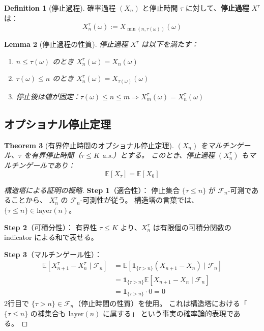 \documentclass[11pt,a4paper]{article}
\theoremstyle{plain}
\newtheorem{theorem}{Theorem}[section]
\newtheorem{lemma}[theorem]{Lemma}
\theoremstyle{definition}
\newtheorem{definition}[theorem]{Definition}
\newcommand{\FF}{\mathcal{F}}
\newcommand{\EE}{\mathbb{E}}
\newcommand{\layer}{\mathrm{layer}}
\begin{document}
\begin{definition}[停止過程]
\label{def:stopped-process}
確率過程 $(X_n)$ と停止時間 $\tau$ に対して、\textbf{停止過程} $X^\tau$ は：
\[
  X^\tau_n(\omega) := X_{\min(n, \tau(\omega))}(\omega)
\]
\end{definition}

\begin{lemma}[停止過程の性質]
\label{lem:stopped-process-properties}
停止過程 $X^\tau$ は以下を満たす：
\begin{enumerate}[label=(\roman*)]
  \item $n \leq \tau(\omega)$ のとき $X^\tau_n(\omega) = X_n(\omega)$
  \item $\tau(\omega) \leq n$ のとき $X^\tau_n(\omega) = X_{\tau(\omega)}(\omega)$
  \item 停止後は値が固定：$\tau(\omega) \leq n \leq m \Rightarrow X^\tau_m(\omega) = X^\tau_n(\omega)$
\end{enumerate}
\end{lemma}

\subsection{オプショナル停止定理}

\begin{theorem}[有界停止時間のオプショナル停止定理]
\label{thm:optional-stopping}
$(X_n)$ をマルチンゲール、$\tau$ を有界停止時間（$\tau \leq K$ a.s.）とする。
このとき、停止過程 $(X^\tau_n)$ もマルチンゲールであり：
\[
  \EE[X_\tau] = \EE[X_0]
\]
\end{theorem}

\begin{proof}[構造塔による証明の概略]
\textbf{Step 1}（適合性）：
停止集合 $\{\tau \leq n\}$ が $\FF_n$-可測であることから、
$X^\tau_n$ の $\FF_n$-可測性が従う。
構造塔の言葉では、$\{\tau \leq n\} \in \layer(n)$。

\textbf{Step 2}（可積分性）：
有界性 $\tau \leq K$ より、$X^\tau_n$ は有限個の可積分関数の
indicator による和で表せる。

\textbf{Step 3}（マルチンゲール性）：
\begin{align*}
  \EE[X^\tau_{n+1} - X^\tau_n \mid \FF_n] 
  &= \EE[\mathbf{1}_{\{\tau > n\}}(X_{n+1} - X_n) \mid \FF_n] \\
  &= \mathbf{1}_{\{\tau > n\}} \EE[X_{n+1} - X_n \mid \FF_n] \\
  &= \mathbf{1}_{\{\tau > n\}} \cdot 0 = 0
\end{align*}
2行目で $\{\tau > n\} \in \FF_n$（停止時間の性質）を使用。
これは構造塔における「$\{\tau \leq n\}$ の補集合も $\layer(n)$ に属する」
という事実の確率論的表現である。
\end{proof}
\end{document}
